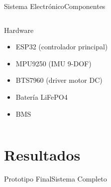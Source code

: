 \documentclass[10pt,xcolor={dvipsnames}]{beamer}
\begin{document}
\begin{frame}{Sistema Electrónico}{Componentes}

\begin{columns}
\begin{block}{Hardware}
\begin{itemize}
    \item ESP32 (controlador principal)
    \item MPU9250 (IMU 9-DOF)
    \item BTS7960 (driver motor DC)
    \item Batería LiFePO4
    \item BMS
\end{itemize}
\end{block}

\begin{center}
\end{center}
\end{columns}

\vspace{0.3cm}

\begin{center}
\end{center}
\end{frame}

\section{Resultados}
\begin{frame}{Prototipo Final}{Sistema Completo}

\begin{center}
\end{center}

\vspace{0.3cm}

\begin{columns}

\end{columns}
\end{frame}
\end{document}
